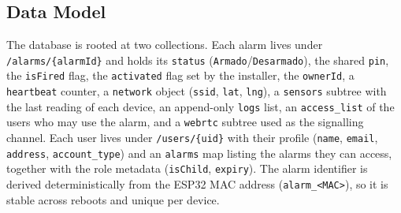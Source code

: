 \documentclass[10pt,twocolumn]{article}
\begin{document}
\subsection{Data Model}
The database is rooted at two collections. Each alarm lives under \texttt{/alarms/\{alarmId\}} and holds its \texttt{status} (\texttt{Armado}/\texttt{Desarmado}), the shared \texttt{pin}, the \texttt{isFired} flag, the \texttt{activated} flag set by the installer, the \texttt{ownerId}, a \texttt{heartbeat} counter, a \texttt{network} object (\texttt{ssid}, \texttt{lat}, \texttt{lng}), a \texttt{sensors} subtree with the last reading of each device, an append-only \texttt{logs} list, an \texttt{access\_list} of the users who may use the alarm, and a \texttt{webrtc} subtree used as the signalling channel. Each user lives under \texttt{/users/\{uid\}} with their profile (\texttt{name}, \texttt{email}, \texttt{address}, \texttt{account\_type}) and an \texttt{alarms} map listing the alarms they can access, together with the role metadata (\texttt{isChild}, \texttt{expiry}). The alarm identifier is derived deterministically from the ESP32 MAC address (\texttt{alarm\_<MAC>}), so it is stable across reboots and unique per device.
\end{document}

